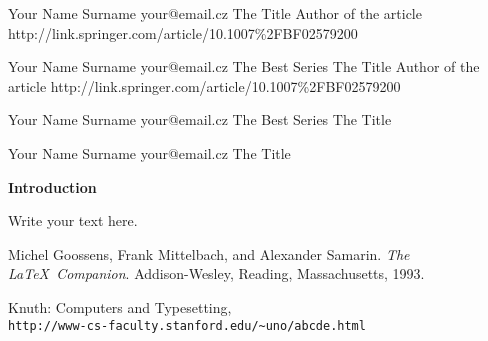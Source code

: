 \documentclass[12pt]{report}
\newcommand{\Talk}[4]{%
  \Id\FirstName #1 \Surname #2 \Email #3
  \Serie
  \Title #4
  \PaperAuthor
  \Link
  \Text\End
}
\newcommand{\PaperTalk}[6]{%
  \Id\FirstName #1 \Surname #2 \Email #3
  \Serie
  \Title #5
  \PaperAuthor #4
  \Link #6
  \Text\End
}
\newcommand{\SeriesTalk}[7]{%
  \Id\FirstName #1 \Surname #2 \Email #3
  \Serie #6
  \Title #5
  \PaperAuthor #4
  \Link #7
  \Text\End
}
\newcommand{\SeriesOther}[5]{%
  \Id\FirstName #1 \Surname #2 \Email #3
  \Serie #5
  \Title #4
  \PaperAuthor
  \Link
  \Text\End
}
\def\section#1{\vskip 9pt plus 2pt minus 1pt\centerline{\bf #1}\par\ignorespaces}
\begin{document}
\PaperTalk{Your Name}{Surname}{your@email.cz}{Author of the article}{The Title}{http://link.springer.com/article/10.1007\%2FBF02579200}
\SeriesTalk{Your Name}{Surname}{your@email.cz}{Author of the article}{The Title}{The Best Series}{http://link.springer.com/article/10.1007\%2FBF02579200}
\SeriesOther{Your Name}{Surname}{your@email.cz}{The Title}{The Best Series}
\Talk{Your Name}{Surname}{your@email.cz}{The Title}
\section{Introduction}
Write your text here.




\literaturestart
	
Michel Goossens, Frank Mittelbach, and Alexander Samarin. 
\textit{The \LaTeX\ Companion}. 
Addison-Wesley, Reading, Massachusetts, 1993.
 
 
Knuth: Computers and Typesetting,
\\\texttt{http://www-cs-faculty.stanford.edu/\~{}uno/abcde.html}

\literatureend
\end{document}

